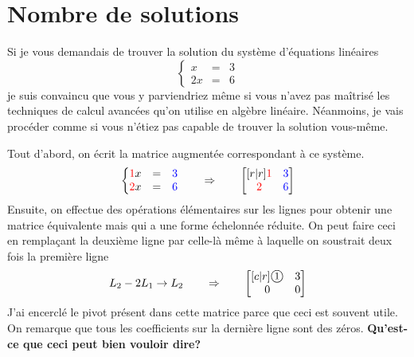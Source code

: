 \chapter{Nombre de solutions}

Si je vous demandais de trouver la solution du
système d'équations linéaires
\[
\left\{
\begin{matrix}
x &=& 3\\
2x &=& 6
\end{matrix}
\right.
\]
je suis convaincu que vous y parviendriez même si
vous n'avez pas maîtrisé les techniques de calcul
avancées qu'on utilise en algèbre linéaire.
Néanmoins, je vais procéder comme si vous n'étiez pas
capable de trouver la solution vous-même.

Tout d'abord, on écrit la matrice augmentée correspondant
à ce système.
\[
\left\{
\begin{matrix}
{\color{red}1}x &=& {\color{blue}3}\\
{\color{red}2}x &=& {\color{blue}6}
\end{matrix}
\right.
\qquad \Rightarrow\qquad
\begin{bmatrix}[r|r]
{\color{red}1} & {\color{blue}3}\\
{\color{red}2} & {\color{blue}6}
\end{bmatrix}
\]
Ensuite, on effectue des opérations élémentaires sur les
lignes pour obtenir une matrice équivalente mais qui a
une forme échelonnée réduite. On peut faire ceci en remplaçant
la deuxième ligne par celle-là même à laquelle on soustrait
deux fois la première ligne
\[
L_2 - 2L_1 \rightarrow L_2 \qquad \Rightarrow\qquad
\begin{bmatrix}[c|r]
\mbox{\large{\textcircled{\small $1$}}} & 3\\
0 & 0
\end{bmatrix}
\]
J'ai
encerclé le pivot présent dans cette matrice parce que ceci est souvent utile. On remarque que tous les coefficients sur la dernière ligne sont des zéros.
\textbf{Qu'est-ce que ceci peut bien vouloir dire?}

